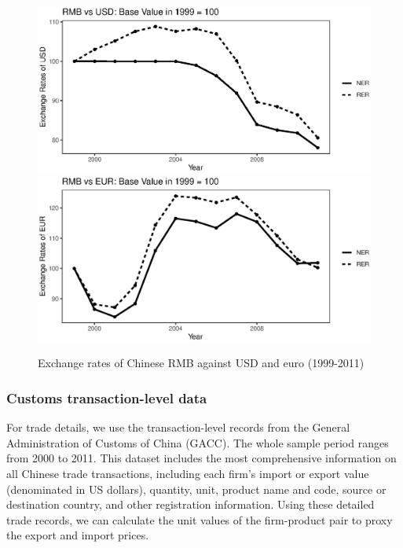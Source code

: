 \begin{figure}[H]
	\centering
	\includegraphics[width=1\textwidth]{R/USD.eps}
	\includegraphics[width=1\textwidth]{R/EUR.eps}
	\caption{Exchange rates of Chinese RMB against USD and euro (1999-2011)}
	\label{fig.ER}
\end{figure}

\subsubsection{Customs transaction-level data} \label{Data-Customs}

For trade details, we use the transaction-level records from the General Administration of Customs of China (GACC). The whole sample period ranges from 2000 to 2011. This dataset includes the most comprehensive information on all Chinese trade transactions, including each firm's import or export value (denominated in US dollars), quantity, unit, product name and code, source or destination country, and other registration information. Using these detailed trade records, we can calculate the unit values of the firm-product pair to proxy the export and import prices.

